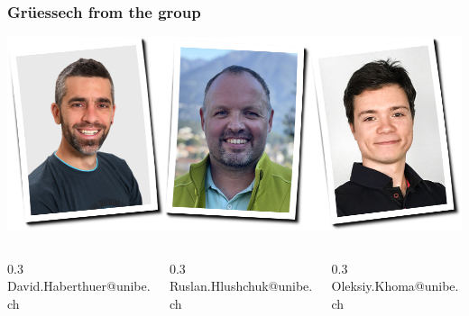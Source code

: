 \begin{frame}
	\frametitle{Grüessech from the \uct group}
	\centering
	\includegraphics[width=\imagewidth]{./images/team}
		\begin{columns}
		\hfill\begin{column}{0.3\imagewidth}
			\centering%
			David{\color{ubRed}.}Haberthuer{\color{ubRed}@unibe.ch}%
		\end{column}
		\begin{column}{0.3\imagewidth}
			\centering%
			Ruslan{\color{ubRed}.}Hlushchuk{\color{ubRed}@unibe.ch}%
		\end{column}
		\begin{column}{0.3\imagewidth}
			\centering%
			Oleksiy{\color{ubRed}.}Khoma{\color{ubRed}@unibe.ch}%
		\end{column}\hfill%
	\end{columns}
\end{frame}

